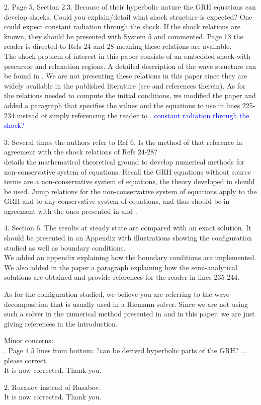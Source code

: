 \documentclass{article}
\newcommand{\tcb}[1]{\textcolor{blue}{#1}}
\begin{document}
{\color{blue}
2. Page 5, Section 2.3. Because of their hyperbolic nature the GRH equations can develop shocks.
Could you explain/detail what shock structure is expected? One could expect constant radiation through the shock.
If the shock relations are known, they should be presented with System 5 and commented. Page 13 the reader is directed to Refs 24 and 28 meaning these relations are available.\\}
The shock problem of interest in this paper consists of an embedded shock with precursor and relaxation regions. A detailed description of the wave structure can be found in \cite{Balsara}. We are not presenting these relations in this paper since they are widely available in the published literature (see \cite{LowrieEdwards, LowrieMorelHittinger} and references therein). As for the relations needed to compute the initial conditions, we modified the paper and added a paragraph that specifies the values and the equations to use in lines 225-234 instead of simply referencing the reader to \cite{LowrieEdwards}. \tcb{constant radiation through the shock?}
\bigskip

{\color{blue}
3. Several times the authors refer to Ref 6. Is the method of that reference in agreement with the shock relations of Refs 24-28?
\\}
\cite{dlm} details the mathematical theoretical ground to develop numerical methods for non-conservative system of equations. Recall the GRH equations without source terms are a non-conservative system of equations, the theory developed in \cite{dlm} should be used. Jump relations for the non-conservative system of equations apply to the GRH and to any conservative system of equations, and thus should be in agreement with the ones presented in \cite{LowrieEdwards} and \cite{Toro}.
\bigskip

{\color{blue}
4. Section 6. The results at steady state are compared with an exact solution. It should be presented in an Appendix with illustrations showing the configuration studied as well as boundary conditions. \\}
We added an appendix explaining how the boundary conditions are implemented. We also added in the paper a paragraph explaining how the semi-analytical solutions are obtained and provide references for the reader in lines 235-244.

As for the configuration studied, we believe you are referring to the wave decomposition that is usually used in a Riemann solver. Since we are not using such a solver in the numerical method presented in \cite{our_jcp_radhy_paper} and in this paper, we are just giving references in the introduction.
\bigskip

{\color{blue}
\noindent Minor concerns: \\
. Page 4,5 lines from bottom: ?can be derived hyperbolic parts of the GRH? ... please correct.\\}
It is now corrected. Thank you.

\bigskip

{\color{blue}
 2. Rusanov instead of Rusabov.\\}
It is now corrected. Thank you.


\end{document}
